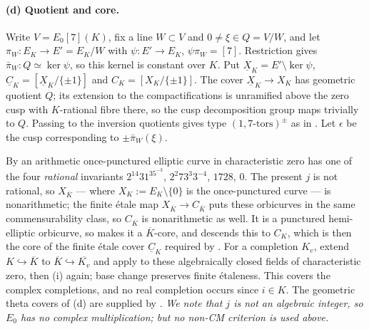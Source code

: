 \documentclass[11pt]{article}
\theoremstyle{plain}
\theoremstyle{definition}
\begin{document}
\paragraph{(d) Quotient and core.}
Write $V=E_0[7](K)$, fix a line $W\subset V$ and $0\ne\xi\in Q=V/W$, and let
$\pi_W:E_K\to E'=E_K/W$ with $\psi:E'\to E_K$, $\psi\pi_W=[7]$.  Restriction gives
$\bar\pi_W:Q\simeq\ker\psi$, so this kernel is constant over $K$.  Put
$\underline X_K=E'\setminus\ker\psi$,
$\underline C_K=[\underline X_K/\{\pm1\}]$ and $C_K=[X_K/\{\pm1\}]$.  The cover
$\underline X_K\to X_K$ has geometric quotient $Q$; its extension to the
compactifications is unramified above the zero cusp with $K$-rational fibre there,
so the cusp decomposition group maps trivially to $Q$.  Passing to the inversion
quotients gives type $(1,7\text{-tors})^\pm$ as in \cite[Def.~2.1]{EtTh}.  Let
$\epsilon$ be the cusp corresponding to $\pm\bar\pi_W(\xi)$.

By \cite[Prop.~2.1]{MFHMP} an arithmetic once-punctured elliptic curve in
characteristic zero has one of the four \emph{rational} invariants
$2^{14}31^35^{-3}$, $2^2 73^3 3^{-4}$, $1728$, $0$.  The present $j$ is not
rational, so $X_{\overline K}$ --- where $X_K:=E_K\setminus\{0\}$ is the
once-punctured curve --- is nonarithmetic; the finite \'etale map
$X_{\overline K}\to C_{\overline K}$ puts these orbicurves in the same
commensurability class, so $C_{\overline K}$ is nonarithmetic as well.  It is a
punctured hemi-elliptic orbicurve, so \cite[Prop.~2.7]{CanLift} makes it a
$\overline K$-core, and \cite[Prop.~2.3(i)]{CanLift} descends this to $C_K$, which
is then the core of the finite \'etale cover $\underline C_K$ required by
\cite[Def.~3.1(d)]{IUT1}.  For a completion $K_v$, extend $K\hookrightarrow
\overline K$ to $\overline K\hookrightarrow\overline{K_v}$ and apply
\cite[Prop.~2.3(ii)]{CanLift} to these algebraically closed fields of
characteristic zero, then (i) again; base change preserves finite \'etaleness.
This covers the complex completions, and no real completion occurs since $i\in K$.
The geometric theta covers of (d) are supplied by
\cite[Prop.~2.2, Def.~2.3]{EtTh}.  \emph{We note that $j$ is not an algebraic
integer, so $E_0$ has no complex multiplication; but no non-CM criterion is used
above.}
\end{document}
